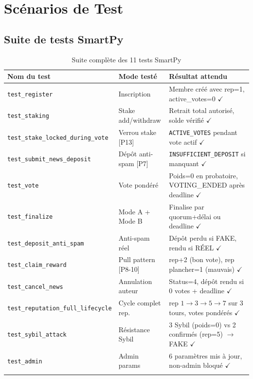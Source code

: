 \documentclass[12pt,a4paper]{article}
\begin{document}
\section{Scénarios de Test}

\subsection{Suite de tests SmartPy}

\begin{longtable}{L{4.2cm} L{3.8cm} L{5cm}}
\toprule
{}
\textbf{Nom du test} & \textbf{Mode testé} & \textbf{Résultat attendu} \\
\midrule
\endhead

\texttt{test\_register}
  & Inscription
  & Membre créé avec rep=1, active\_votes=0 $\checkmark$ \\
\texttt{test\_staking}
  & Stake add/withdraw
  & Retrait total autorisé, solde vérifié $\checkmark$ \\

\texttt{test\_stake\_locked\_during\_vote}
  & Verrou stake [P13]
  & \texttt{ACTIVE\_VOTES} pendant vote actif $\checkmark$ \\
\texttt{test\_submit\_news\_deposit}
  & Dépôt anti-spam [P7]
  & \texttt{INSUFFICIENT\_DEPOSIT} si manquant $\checkmark$ \\

\texttt{test\_vote}
  & Vote pondéré
  & Poids=0 en probatoire, VOTING\_ENDED après deadline $\checkmark$ \\
\texttt{test\_finalize}
  & Mode A + Mode B
  & Finalise par quorum+délai ou deadline $\checkmark$ \\

\texttt{test\_deposit\_anti\_spam}
  & Anti-spam réel
  & Dépôt perdu si FAKE, rendu si RÉEL $\checkmark$ \\
\texttt{test\_claim\_reward}
  & Pull pattern [P8-10]
  & rep+2 (bon vote), rep plancher=1 (mauvais) $\checkmark$ \\

\texttt{test\_cancel\_news}
  & Annulation auteur
  & Status=4, dépôt rendu si 0 votes + deadline $\checkmark$ \\
\texttt{test\_reputation\_full\_lifecycle}
  & Cycle complet rep.
  & rep $1\!\to\!3\!\to\!5\!\to\!7$ sur 3 tours, votes pondérés $\checkmark$ \\

\texttt{test\_sybil\_attack}
  & Résistance Sybil
  & 3 Sybil (poids=0) vs 2 confirmés (rep=5) $\to$ FAKE $\checkmark$ \\
\texttt{test\_admin}
  & Admin params
  & 6 paramètres mis à jour, non-admin bloqué $\checkmark$ \\
\bottomrule
\caption{Suite complète des 11 tests SmartPy}
\end{longtable}
\end{document}
